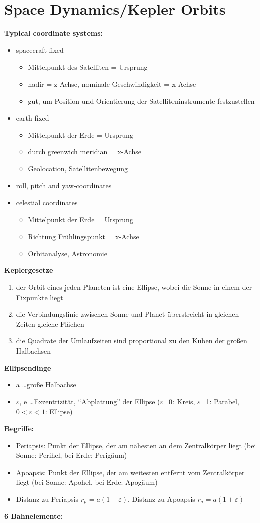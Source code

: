 \documentclass[a4paper,10pt]{article}
\newcommand{\f}{\textbf}
\begin{document}
\section{Space Dynamics/Kepler Orbits}
\f{Typical coordinate systems:}
\begin{itemize}
 \item spacecraft-fixed
 \begin{itemize}
  \item Mittelpunkt des Satelliten = Ursprung
  \item nadir = z-Achse, nominale Geschwindigkeit = x-Achse
  \item gut, um Position und Orientierung der Satelliteninstrumente festzustellen
 \end{itemize}
 \item earth-fixed 
 \begin{itemize}
  \item Mittelpunkt der Erde = Ursprung
  \item durch greenwich meridian = x-Achse
  \item Geolocation, Satellitenbewegung
 \end{itemize}
 \item roll, pitch and yaw-coordinates 
 \item celestial coordinates
 \begin{itemize}
  \item Mittelpunkt der Erde = Ursprung
  \item Richtung Frühlingspunkt = x-Achse
  \item Orbitanalyse, Astronomie
 \end{itemize}
\end{itemize}
\f{Keplergesetze}
\begin{enumerate}
 \item der Orbit eines jeden Planeten ist eine Ellipse, wobei die Sonne in einem der Fixpunkte liegt
 \item die Verbindungslinie zwischen Sonne und Planet überstreicht in gleichen Zeiten gleiche Flächen 
 \item die Quadrate der Umlaufzeiten sind proportional zu den Kuben der großen Halbachsen
\end{enumerate}
\f{Ellipsendinge}
\begin{itemize}
 \item a \dots große Halbachse
 \item $\varepsilon$, e \dots Exzentrizität, ``Abplattung'' der Ellipse ($\varepsilon$=0: Kreis, $\varepsilon$=1: Parabel, $0<\varepsilon<1$: Ellipse)
\end{itemize}
\f{Begriffe: }
\begin{itemize}
 \item Periapsis: Punkt der Ellipse, der am nähesten an dem Zentralkörper liegt (bei Sonne: Perihel, bei Erde: Perigäum)
 \item Apoapsis: Punkt der Ellipse, der am weitesten entfernt vom Zentralkörper liegt (bei Sonne: Apohel, bei Erde: Apogäum)
 \item Distanz zu Periapsis $r_p = a(1-\varepsilon)$, Distanz zu Apoapsis $r_a = a(1+\varepsilon)$
\end{itemize}
\f{6 Bahnelemente:}
\vspace*{10pt}
\end{document}
